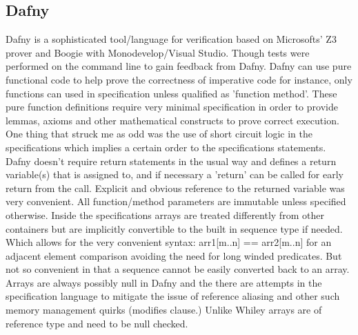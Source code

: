 \documentclass[10pt]{article} %
\begin{document}
\subsection{Dafny}
	Dafny is a sophisticated tool\slash language for verification based on Microsofts' Z3 prover and Boogie with Monodevelop\slash Visual Studio. Though tests were performed on the command line to gain feedback from Dafny. Dafny can use pure functional code to help prove the correctness of imperative code for instance, only functions can used in specification unless qualified as 'function method'. These pure function definitions require very minimal specification in order to provide lemmas, axioms and other mathematical constructs to prove correct execution. One thing that struck me as odd was the use of short circuit logic in the specifications which implies a certain order to the specifications statements. Dafny doesn't require return statements in the usual way and defines a return variable(s) that is assigned to, and if necessary a 'return' can be called for early return from the call. Explicit and obvious reference to the returned variable was very convenient. All function\slash method parameters are immutable unless specified otherwise.
	Inside the specifications arrays are treated differently from other containers but are implicitly convertible to the built in sequence type if needed. Which allows for the very convenient syntax: arr1[m..n] == arr2[m..n] for an adjacent element comparison avoiding the need for long winded predicates. But not so convenient in that a sequence cannot be easily converted back to an array. Arrays are always possibly null in Dafny and the there are attempts in the specification language to mitigate the issue of reference aliasing and other such memory management quirks (modifies clause.) Unlike Whiley arrays are of reference type and need to be null checked.
\end{document}
